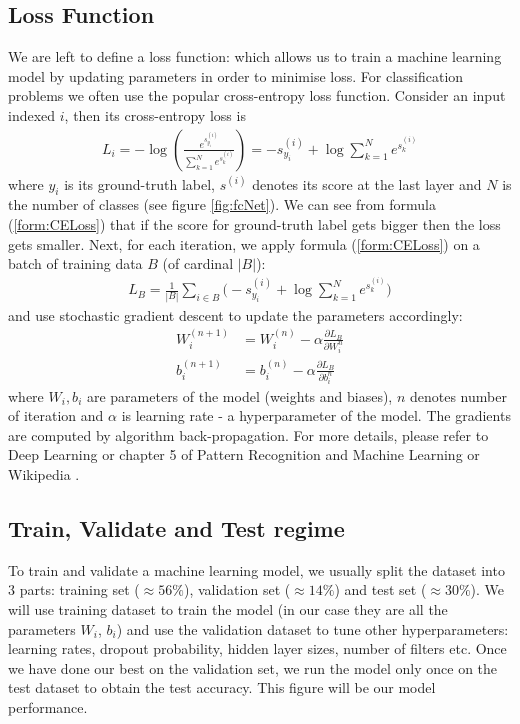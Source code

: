 \subsection{Loss Function}
\label{subsec:loss}
We are left to define a loss function: which allows us to train a machine learning model by updating parameters in order to minimise loss. For classification problems we often use the popular cross-entropy loss function. Consider an input indexed $i$, then its cross-entropy loss is
\begin{align}
\label{form:CELoss}
L_i = -\log(\frac{e^{s^{(i)}_{y_i}}}{\sum_{k=1}^{N}e^{s^{(i)}_k}}) = -s^{(i)}_{y_i} + \log\sum_{k=1}^{N}e^{s^{(i)}_k}
\end{align}
where $y_i$ is its ground-truth label, $s^{(i)}$ denotes its score at the last layer and $N$ is the number of classes (see figure \ref{fig:fcNet}). We can see from formula (\ref{form:CELoss}) that if the score for ground-truth label gets bigger then the loss gets smaller. Next, for each iteration, we apply formula (\ref{form:CELoss}) on a batch of training data $B$ (of cardinal $|B|$):
\begin{align}
L_B = \frac{1}{|B|}\sum_{i \in B} \bigg(-s^{(i)}_{y_i} + \log\sum_{k=1}^{N}e^{s^{(i)}_k}\bigg)
\end{align}
and use stochastic gradient descent \cite{wiki:SGD} to update the parameters accordingly:
\begin{align}
W^{(n+1)}_i &= W^{(n)}_i - \alpha \frac{\partial L_B}{\partial W^{n}_i}\\
b^{(n+1)}_i &= b^{(n)}_i - \alpha \frac{\partial L_B}{\partial b^{n}_i}
\end{align}
where $W_i, b_i$ are parameters of the model (weights and biases), $n$ denotes number of iteration and $\alpha$ is learning rate - a hyperparameter of the model. The gradients are computed by algorithm back-propagation. For more details, please refer to Deep Learning \cite{Goodfellow-et-al-2016} or chapter 5 of Pattern Recognition and Machine Learning \cite{Bishop:2006:PRM:1162264} or Wikipedia \cite{wiki:backpropagation}.

\subsection{Train, Validate and Test regime}
\label{subsec:trainRegime}
To train and validate a machine learning model, we usually split the dataset into 3 parts: training set ($\approx56\%$), validation set ($\approx14\%$) and test set ($\approx30\%$). We will use training dataset to train the model (in our case they are all the parameters $W_i$, $b_i$) and use the validation dataset to tune other hyperparameters: learning rates, dropout probability, hidden layer sizes, number of filters etc. Once we have done our best on the validation set, we run the model only once on the test dataset to obtain the test accuracy. This figure will be our model performance. 

